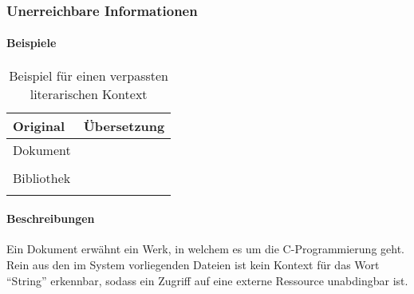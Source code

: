\subsubsection{Unerreichbare Informationen}

\paragraph*{Beispiele}
\begin{table}[h!]
    \centering
    \begin{tabularx}{\textwidth}{X X}
        \toprule
            Original & Übersetzung\\
        \midrule
            Dokument & \\
             & \\[2em]
            Bibliothek & \\
             & \\
        \bottomrule
    \end{tabularx}
    \caption{Beispiel für einen verpassten literarischen Kontext}\label{tab:problems:nonexisting}%
\end{table}

\paragraph*{Beschreibungen}
Ein Dokument erwähnt ein Werk, in welchem es um die C-Programmierung geht. Rein aus den im System vorliegenden Dateien ist kein Kontext für das Wort \enquote{String} erkennbar, sodass ein Zugriff auf eine externe Ressource unabdingbar ist.

